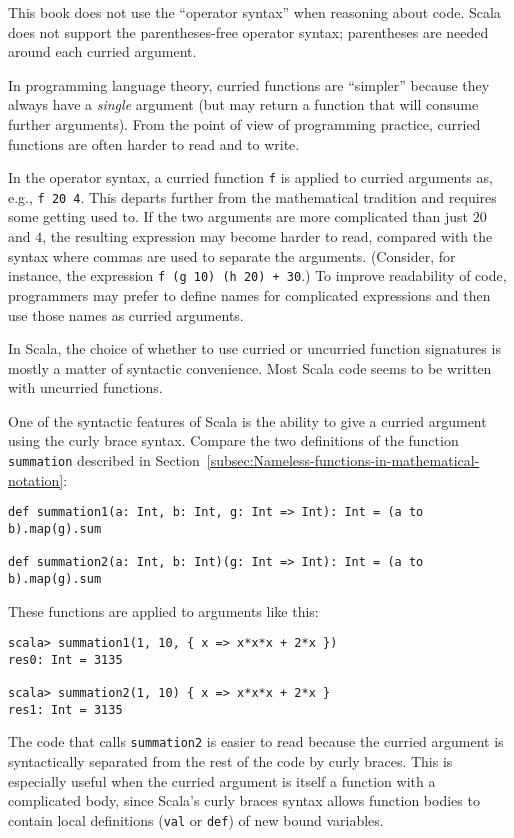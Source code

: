 This book does not use the \textsf{``}operator syntax\textsf{''} when reasoning about
code. Scala does not support the parentheses-free operator syntax;
parentheses are needed around each curried argument.

In programming language theory, curried functions are \textsf{``}simpler\textsf{''}
because they always have a \emph{single} argument (but may return
a function that will consume further arguments). From the point of
view of programming practice, curried functions are often harder to
read and to write.

In the operator syntax, a curried function \lstinline!f! is applied
to curried arguments as, e.g., \lstinline!f 20 4!. This departs further
from the mathematical tradition and requires some getting used to.
If the two arguments are more complicated than just $20$ and $4$,
the resulting expression may become harder to read, compared with
the syntax where commas are used to separate the arguments. (Consider,
for instance, the expression \lstinline!f (g 10) (h 20) + 30!.) To
improve readability of code, programmers may prefer to define names
for complicated expressions and then use those names as curried arguments.

In Scala, the choice of whether to use curried or uncurried function
signatures is mostly a matter of syntactic convenience. Most Scala
code seems to be written with uncurried functions.

One of the syntactic features of Scala is the ability to give a curried
argument using the curly brace syntax. Compare the two definitions
of the function \lstinline!summation! described in Section~\ref{subsec:Nameless-functions-in-mathematical-notation}:
\begin{lstlisting}
def summation1(a: Int, b: Int, g: Int => Int): Int = (a to b).map(g).sum

def summation2(a: Int, b: Int)(g: Int => Int): Int = (a to b).map(g).sum
\end{lstlisting}
These functions are applied to arguments like this:
\begin{lstlisting}
scala> summation1(1, 10, { x => x*x*x + 2*x })
res0: Int = 3135

scala> summation2(1, 10) { x => x*x*x + 2*x }
res1: Int = 3135
\end{lstlisting}
The code that calls \lstinline!summation2! is easier to read because
the curried argument is syntactically separated from the rest of the
code by curly braces. This is especially useful when the curried argument
is itself a function with a complicated body, since Scala\textsf{'}s curly
braces syntax allows function bodies to contain local definitions
(\lstinline!val! or \lstinline!def!) of new bound variables.

